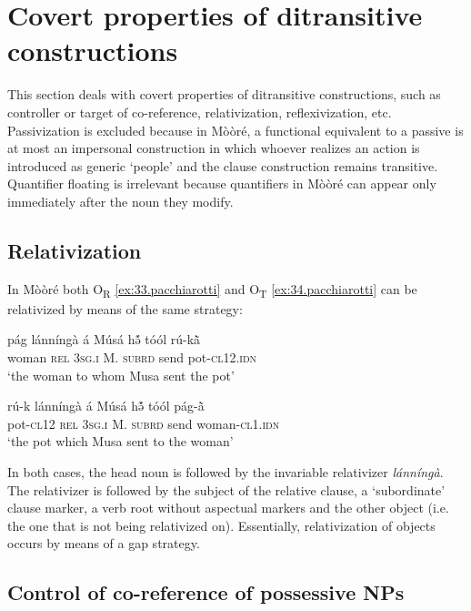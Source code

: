 \documentclass[output=paper]{langsci/langscibook}
\begin{document}
\section{Covert properties of ditransitive constructions}\label{§5:covert.pacchiarotti}

This section deals with covert properties of ditransitive constructions, such as controller or target of co-reference, relativization, reflexivization, etc. Passivization is excluded because in Mòòré, a functional equivalent to a passive is at most an impersonal construction in which whoever realizes an action is introduced as generic `people' and the clause construction remains transitive. Quantifier floating is irrelevant because quantifiers in Mòòré can appear only immediately after the noun they modify. 

\subsection{Relativization}\label{§5.1:relativization.pacchiarotti}

In Mòòré both O\textsubscript{R} \ref{ex:33.pacchiarotti} and O\textsubscript{T} \ref{ex:34.pacchiarotti} can be relativized by means of the same strategy:

\ea
\label{ex:33.pacchiarotti}
\gll p\'{a}g    l\'{a}nn\'{i}ng\`{a}  \'{a}    M\'{u}s\'{a}  hə̃́    t\'{o}\'{o}l  r\'{u}-k\`{\~{a}}\\
woman  \textsc{rel}    \textsc{3sg.i  }  M.  \textsc{subrd}    send  pot-\textsc{cl12.idn}\\
\glt `the woman to whom Musa sent the pot'
\z

\ea
\label{ex:34.pacchiarotti}
\gll r\'{u}-k    l\'{a}nn\'{i}ng\`{a}  \'{a}    M\'{u}s\'{a}  hə̃́    t\'{o}\'{o}l  p\'{a}g-\`{\~{a}}\\
pot-\textsc{cl12}  \textsc{rel}    \textsc{3sg.i  }  M.  \textsc{subrd}    send  woman-\textsc{cl1.idn}\\
\glt `the pot which Musa sent to the woman'
\z

In both cases, the head noun is followed by the invariable relativizer \textit{l\'{a}nn\'{i}ng\`{a}}. The relativizer is followed by the subject of the relative clause, a `subordinate' clause marker, a verb root without aspectual markers and the other object (i.e. the one that is not being relativized on). Essentially, relativization of objects occurs by means of a gap strategy. 

\subsection{Control of co-reference of possessive NPs}\label{§5.2:Control.pacchiarotti}
\end{document}
